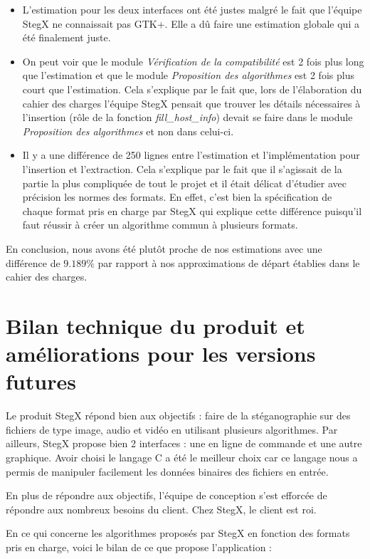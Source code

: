 \documentclass[11pt]{article}
\begin{document}
\begin{itemize}
\item L'estimation pour les deux interfaces ont été justes malgré le fait 
que l'équipe StegX ne connaissait pas GTK+. Elle a dû faire une estimation 
globale qui a été finalement juste. 
\item On peut voir que le module \textit{Vérification de la compatibilité}
est 2 fois plus long que l'estimation et que le module \textit{Proposition 
des algorithmes} est 2 fois plus court que l'estimation. Cela s'explique 
par le fait que, lors de l'élaboration du cahier des charges l'équipe StegX
pensait que trouver les détails nécessaires à l'insertion (rôle de la fonction 
\textit{fill\_host\_info}) devait se faire dans le module \textit{Proposition 
des algorithmes} et non dans celui-ci.  
\item Il y a une différence de 250 lignes entre l'estimation et l'implémentation 
pour l'insertion et l'extraction. Cela s'explique par le fait que il s'agissait 
de la partie la plus compliquée de tout le projet et il était délicat d'étudier 
avec précision les normes des formats. En effet, c'est bien la spécification de 
chaque format pris en charge par StegX qui explique cette différence puisqu'il 
faut réussir à créer un algorithme commun à plusieurs formats. 
\end{itemize}

En conclusion, nous avons été plutôt proche de nos estimations avec une 
différence de $9.189\%$ par rapport à nos approximations de départ établies 
dans le cahier des charges. 

\section{Bilan technique du produit et améliorations pour les versions futures}

Le produit StegX répond bien aux objectifs : faire de la stéganographie sur des
fichiers de type image, audio et vidéo en utilisant plusieurs algorithmes. Par
ailleurs, StegX propose bien 2 interfaces : une en ligne de commande et une
autre graphique. Avoir choisi le langage C a été le meilleur choix car ce
langage nous a permis de manipuler facilement les données binaires des fichiers
en entrée. 

En plus de répondre aux objectifs, l'équipe de conception s'est efforcée 
de répondre aux nombreux besoins du client. Chez StegX, le client est roi.

En ce qui concerne les algorithmes proposés par StegX en fonction des 
formats pris en charge, voici le bilan de ce que propose l'application : 
\newline
\end{document}
